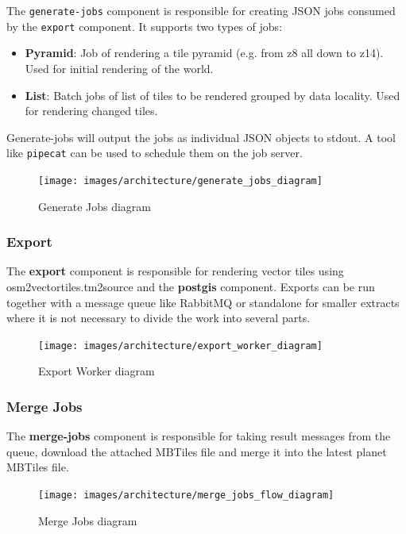 The \texttt{generate-jobs} component is responsible for creating JSON jobs consumed by the \texttt{export} component. It supports two types of jobs:

\begin{itemize}
  \item \textbf{Pyramid}: Job of rendering a tile pyramid (e.g. from z8 all down to z14). Used for initial rendering of the world.
  \item \textbf{List}: Batch jobs of list of tiles to be rendered grouped by data locality. Used for rendering changed tiles.
\end{itemize}

Generate-jobs will output the jobs as individual JSON objects to stdout. A tool like \texttt{pipecat} can be used to schedule them on the job server.

\begin{figure}[H]
  \centering
  \texttt{[image: images/architecture/generate\_jobs\_diagram]}
  \caption{Generate Jobs diagram}
\end{figure}
\clearpage

\subsubsection{Export}

The \textbf{export} component is responsible for rendering vector tiles using osm2vectortiles.tm2source and the \textbf{postgis} component. Exports can be run together with a message queue like RabbitMQ or standalone for smaller extracts where it is not necessary to divide the work into several parts.

\begin{figure}[H]
  \centering
  \texttt{[image: images/architecture/export\_worker\_diagram]}
  \caption{Export Worker diagram}
\end{figure}

\subsubsection{Merge Jobs}

The \textbf{merge-jobs} component is responsible for taking result messages from the queue, download the attached MBTiles file and merge it into the latest planet MBTiles file.

\begin{figure}[H]
  \centering
  \texttt{[image: images/architecture/merge\_jobs\_flow\_diagram]}
  \caption{Merge Jobs diagram}
\end{figure}

